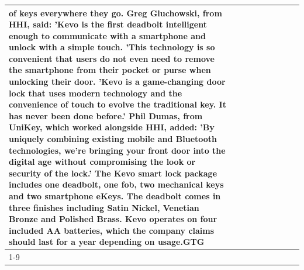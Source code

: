 \begin{table}[H]
\begin{tabular}{lllrlllll}
of keys everywhere they go. Greg Gluchowski, from HHI, said: 'Kevo is the first deadbolt intelligent enough to communicate with a smartphone and unlock with a simple touch. 'This technology is so convenient that users do not even need to remove the smartphone from their pocket or purse when unlocking their door. 'Kevo is a game-changing door lock that uses modern technology and the convenience of touch to evolve the traditional key. It has never been done before.' Phil Dumas, from UniKey, which worked alongside HHI, added: 'By uniquely combining existing mobile and Bluetooth technologies, we’re bringing your front door into the digital age without compromising the look or security of the lock.' The Kevo smart lock package includes one deadbolt, one fob, two mechanical keys and two smartphone eKeys. The deadbolt comes in three finishes including Satin Nickel, Venetian Bronze and Polished Brass. Kevo operates on four included AA batteries, which the company claims should last for a year depending on usage.GTG \\
\cline{1-9}

\end{tabular}
\end{table}
